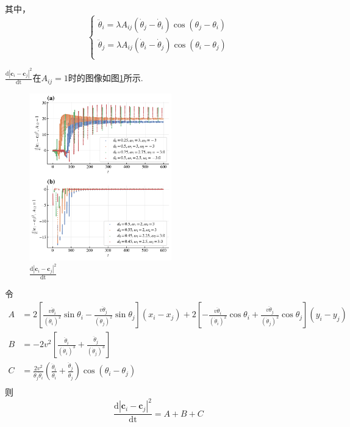 \documentclass{article}
\begin{document}
其中，
\begin{equation}\label{eq:ddotTheta}
    \begin{cases}
        \ddot{\theta}_i=\lambda A_{ij}\left( \dot{\theta}_j-\dot{\theta}_i \right) \cos \left( \theta _j-\theta _i \right)\\
        \ddot{\theta}_j=\lambda A_{ij}\left( \dot{\theta}_i-\dot{\theta}_j \right) \cos \left( \theta _i-\theta _j \right)\\
    \end{cases}
\end{equation}

$\frac{\mathrm{d}\left| \mathbf{c}_i-\mathbf{c}_j \right|^2}{\mathrm{dt}}$在$A_{ij}=1$时的图像如图\ref{fig:2OsDotDistance}所示.

\begin{figure}[H]
    \centering
    \includegraphics[width=0.55\textwidth]{./figs/2OsDotDistance.pdf}
    \caption{$\frac{\mathrm{d}\left| \mathbf{c}_i-\mathbf{c}_j \right|^2}{\mathrm{dt}}$}
    \label{fig:2OsDotDistance}
\end{figure}

令$$
\begin{aligned}
	A&=2\left[ \frac{v\ddot{\theta}_i}{\left( \dot{\theta}_i \right) ^2}\sin \theta _i-\frac{v\ddot{\theta}_j}{\left( \dot{\theta}_j \right) ^2}\sin \theta _j \right] \left( x_i-x_j \right) +2\left[ -\frac{v\ddot{\theta}_i}{\left( \dot{\theta}_i \right) ^2}\cos \theta _i+\frac{v\ddot{\theta}_j}{\left( \dot{\theta}_j \right) ^2}\cos \theta _j \right] \left( y_i-y_j \right)\\
	B&=-2v^2\left[ \frac{\ddot{\theta}_i}{\left( \dot{\theta}_i \right) ^3}+\frac{\ddot{\theta}_j}{\left( \dot{\theta}_j \right) ^3} \right]\\
	C&=\frac{2v^2}{\dot{\theta}_j\dot{\theta}_i}\left( \frac{\ddot{\theta}_i}{\dot{\theta}_i}+\frac{\ddot{\theta}_j}{\dot{\theta}_j} \right) \cos \left( \theta _i-\theta _j \right)\\
\end{aligned}
$$
则
$$
\frac{\mathrm{d}\left| \mathbf{c}_i-\mathbf{c}_j \right|^2}{\mathrm{dt}}=A+B+C
$$
\end{document}
